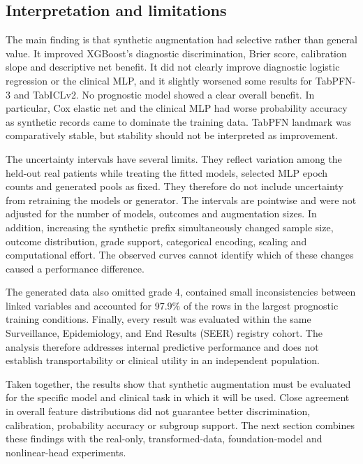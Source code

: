 \subsection{Interpretation and limitations}
\label{sec:augmentation:limits}

The main finding is that synthetic augmentation had selective rather than
general value.  It improved XGBoost's diagnostic discrimination, Brier score,
calibration slope and descriptive net benefit.  It did not clearly improve
diagnostic logistic regression or the clinical MLP, and it slightly worsened
some results for TabPFN-3 and TabICLv2.  No prognostic model showed a clear
overall benefit.  In particular, Cox elastic net and the clinical MLP had worse
probability accuracy as synthetic records came to dominate the training data.
TabPFN landmark was comparatively stable, but stability should not be
interpreted as improvement.

The uncertainty intervals have several limits.  They reflect variation among
the held-out real patients while treating the fitted models, selected MLP epoch
counts and generated pools as fixed.  They therefore do not include uncertainty
from retraining the models or generator.  The intervals are pointwise and were
not adjusted for the number of models, outcomes and augmentation sizes.  In
addition, increasing the synthetic prefix simultaneously changed sample size,
outcome distribution, grade support, categorical encoding, scaling and
computational effort.  The observed curves cannot identify which of these
changes caused a performance difference.

The generated data also omitted grade 4, contained small inconsistencies
between linked variables and accounted for 97.9\% of the rows in the largest
prognostic training conditions.  Finally, every result was
evaluated within the same Surveillance, Epidemiology, and End Results (SEER)
registry cohort.  The analysis therefore addresses internal predictive
performance and does not establish transportability or clinical utility in an
independent population.

Taken together, the results show that synthetic augmentation must be evaluated
for the specific model and clinical task in which it will be used.  Close
agreement in overall feature distributions did not guarantee better
discrimination, calibration, probability accuracy or subgroup support.  The
next section combines these findings with the real-only, transformed-data,
foundation-model and nonlinear-head experiments.

\FloatBarrier
